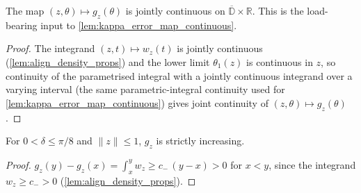 \begin{lemma}

  \label{lem:continuous_uncurry_align_reparam}
  The map $(z,\theta)\mapsto g_z(\theta)$ is jointly continuous on
  $\overline{\mathbb D}\times\mathbb R$. This is the load-bearing input to
  \cref{lem:kappa_error_map_continuous}.
\end{lemma}
\begin{proof}
  \leanok
  The integrand $(z,t)\mapsto w_z(t)$ is jointly continuous
  (\cref{lem:align_density_props}) and the lower limit $\theta_1(z)$ is continuous
  in $z$, so continuity of the parametrised integral with a jointly continuous
  integrand over a varying interval (the same parametric-integral continuity used
  for \cref{lem:kappa_error_map_continuous}) gives joint continuity of
  $(z,\theta)\mapsto g_z(\theta)$.
\end{proof}

\begin{lemma}

  \label{lem:strict_mono_align_reparam}
  For $0<\delta\le\pi/8$ and $\|z\|\le1$, $g_z$ is strictly increasing.
\end{lemma}
\begin{proof}
  \leanok
  $g_z(y)-g_z(x)=\int_x^y w_z\ge c_-\,(y-x)>0$ for $x<y$, since the integrand
  $w_z\ge c_->0$ (\cref{lem:align_density_props}).
\end{proof}

